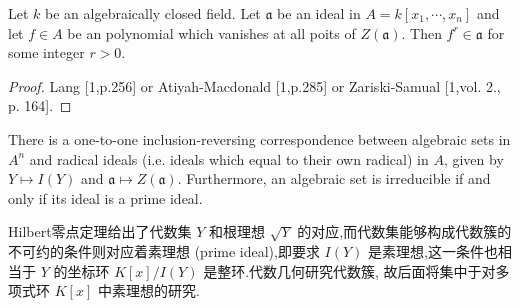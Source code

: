   \begin{theorem}
    Let $k$ be an algebraically closed field. Let $\mathfrak{a}$ be an ideal in $A=k[x_1,\cdots,x_n]$ and let $f\in A$ be an polynomial which vanishes at all poits of $Z(\mathfrak{a})$. Then $f^r\in \mathfrak{a}$ for some integer $r>0$.
  \end{theorem}
\begin{proof}
  Lang [1,p.256]\cite{lang2012algebra} or Atiyah-Macdonald [1,p.285] or Zariski-Samual [1,vol. 2., p. 164].
\end{proof}
\begin{corollary}
  There is a one-to-one inclusion-reversing correspondence between algebraic sets in $A^n$  and radical ideals (i.e. ideals which equal to their own radical) in $A$, given by $Y\mapsto I(Y)$ and $\mathfrak{a}\mapsto Z(\mathfrak{a})$. Furthermore, an algebraic set is irreducible if and only if its ideal is a prime ideal.
\end{corollary}

Hilbert零点定理给出了代数集 $Y$ 和根理想 $\sqrt{Y}$ 的对应,而代数集能够构成代数簇的不可约的条件则对应着素理想 (prime ideal),即要求 $I(Y)$ 是素理想,这一条件也相当于 $Y$ 的坐标环 $K[x] / I(Y)$ 是整环.代数几何研究代数簇, 故后面将集中于对多项式环 $K[x]$ 中素理想的研究.
